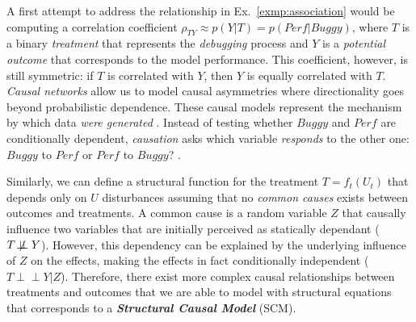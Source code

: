 A first attempt to address the relationship in Ex.~\ref{exmp:association} would be computing a correlation coefficient $\rho_{TY}\approx p(Y|T)=p(Perf|Buggy)$, where $T$ is a binary \textit{treatment} that represents the \textit{debugging} process and $Y$ is a \textit{potential outcome} that corresponds to the model performance. This coefficient, however, is still symmetric: if $T$ is correlated with $Y$, then $Y$ is equally correlated with $T$. \textit{Causal networks} allow us to model causal asymmetries where directionality goes beyond probabilistic dependence. These causal models represent the mechanism by which data \textit{were generated} \cite{Pearl2016Causality}. Instead of testing whether $Buggy$ and $Perf$ are conditionally dependent, \textit{causation} asks which variable \textit{responds} to the other one: $Buggy$ to $Perf$ or $Perf$ to $Buggy$? \cite{Pearl2016Causality}.


Similarly, we can define a structural function for the treatment $T=f_t(U_t)$ that depends only on $U$ disturbances assuming that no \textit{common causes} exists between outcomes and treatments. A common cause is a random variable $Z$ that causally influence two variables that are initially perceived as statically dependant ($T \not\!\perp\!\!\!\perp Y$). However, this dependency can be explained by the underlying influence of $Z$ on the effects, making the effects in fact conditionally independent ($T \perp\!\!\!\perp Y | Z$). Therefore, there exist more complex causal relationships between treatments and outcomes that we are able to model with structural equations that corresponds to a \textit{\textbf{Structural Causal Model}} (SCM). 


